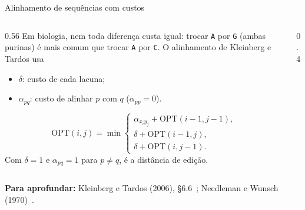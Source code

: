 \documentclass[aspectratio=169,xcolor=table]{beamer}
\newcommand{\fonte}[1]{%
  \vfill
  {\tiny\color{gray!55!black}\textbf{Para aprofundar:} #1\par}%
}
\begin{document}
\begin{frame}{Alinhamento de sequências com custos}
  \begin{columns}[c]
    \begin{column}{0.56\textwidth}
      \scriptsize Em biologia, nem toda diferença custa igual: trocar \texttt{A} por
      \texttt{G} (ambas purinas) é mais comum que trocar \texttt{A} por \texttt{C}. O
      alinhamento de Kleinberg e Tardos usa
      \begin{itemize}\scriptsize
        \item $\delta$: custo de cada lacuna;
        \item $\alpha_{pq}$: custo de alinhar $p$ com $q$ ($\alpha_{pp} = 0$).
      \end{itemize}
      \[
        \mathrm{OPT}(i,j) = \min
        \begin{cases}
          \alpha_{x_i y_j} + \mathrm{OPT}(i-1,j-1),\\
          \delta + \mathrm{OPT}(i-1,j),\\
          \delta + \mathrm{OPT}(i,j-1).
        \end{cases}
      \]
      Com $\delta = 1$ e $\alpha_{pq} = 1$ para $p \ne q$, é a distância de edição.
    \end{column}
    \begin{column}{0.4\textwidth}
      \centering
    \end{column}
  \end{columns}
  \fonte{Kleinberg e Tardos (2006), \S 6.6~\cite{kleinberg2006algorithm};
    Needleman e Wunsch (1970)~\cite{needleman1970general}.}
\end{frame}
\end{document}
